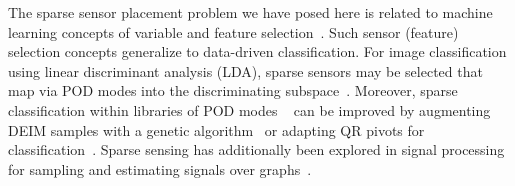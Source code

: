 \documentclass[letterpaper]{IEEEtran}
\begin{document}
The sparse sensor placement problem we have posed here is related to machine learning
concepts of variable and feature selection~\cite{Tibshirani1996lasso,Guyon2003jmlr}. 
Such sensor (feature) selection concepts generalize to data-driven classification. For image classification using linear discriminant analysis (LDA), sparse sensors may be selected that map via POD modes into the discriminating subspace~\cite{Brunton2016siap}.  Moreover, sparse classification within libraries of POD modes ~\cite{Wright2009ieeetpami,Bright2013pof,Brunton2014siads} can be improved by augmenting DEIM samples with a genetic algorithm~\cite{Sargsyan2015pre} or adapting QR pivots for classification~\cite{Manohar2016jfs}. Sparse sensing has additionally been explored in signal processing for sampling and estimating signals over graphs~\cite{Ribeiro2010sigcomm,DiLorenzo2016ieee,Chen2016ieee,Chepuri2016sam}.
\end{document}
